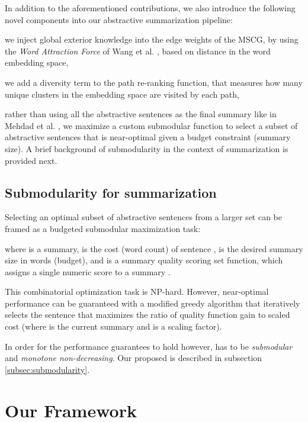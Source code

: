 \documentclass[11pt,a4paper]{article}
\begin{document}
\vspace{-.3cm}

In addition to the aforementioned contributions, we also introduce the following novel components into our abstractive summarization pipeline:

 we inject global exterior knowledge into the edge weights of the MSCG, by using the \textit{Word Attraction Force} of Wang et al. , based on distance in the word embedding space,

 we add a diversity term to the path re-ranking function, that measures how many unique clusters in the embedding space are visited by each path,

 rather than using all the abstractive sentences as the final summary like in Mehdad et al. , we maximize a custom submodular function to select a subset of abstractive sentences that is near-optimal given a budget constraint (summary size). A brief background of submodularity in the context of summarization is provided next.

\subsection{Submodularity for summarization \cite{lin2010multi,lin2012submodularity}}\label{sub:rel_sub}
Selecting an optimal subset of abstractive sentences from a larger set can be framed as a budgeted submodular maximization task:


where  is a summary,  is the cost (word count) of sentence ,  is the desired summary size in words (budget), and  is a summary quality scoring set function, which assigns a single numeric score to a summary .

This combinatorial optimization task is NP-hard. However, near-optimal performance can be guaranteed with a modified greedy algorithm \cite{lin2010multi} that iteratively selects the sentence  that maximizes the ratio of quality function gain to scaled cost  (where  is the current summary and  is a scaling factor).

In order for the performance guarantees to hold however,  has to be \textit{submodular} and \textit{monotone non-decreasing}. Our proposed  is described in subsection \ref{subsec:submodularity}.

\section{Our Framework} \label{sec:proposed_system}
\end{document}
